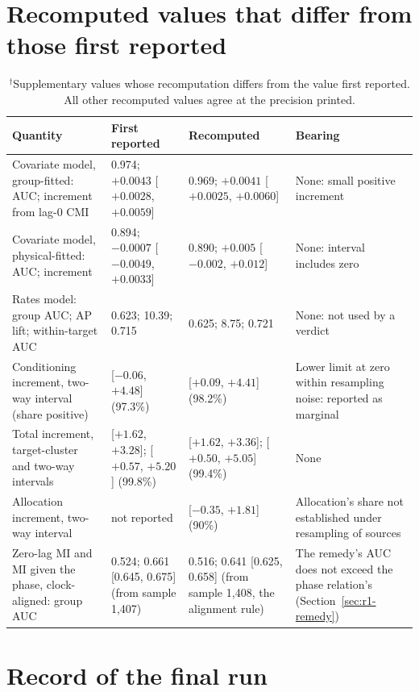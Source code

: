 \section{Recomputed values that differ from those first reported}

\begin{table}[tbp]
  \centering
  \footnotesize
  \caption[Recomputed values that differ from those first reported]{$^{\dagger}$Supplementary values whose recomputation differs from the value first reported. All other recomputed values agree at the precision printed.}
  \label{tab:app-recompute}
  \begin{tabular}{@{}L{5.2cm}L{3.2cm}L{3.2cm}L{3.0cm}@{}}
    \toprule
    Quantity & First reported & Recomputed & Bearing \\
    \midrule
    Covariate model, group-fitted: AUC; increment from lag-0 CMI & 0.974; $+0.0043$ [$+0.0028$, $+0.0059$] & 0.969; $+0.0041$ [$+0.0025$, $+0.0060$] & None: small positive increment \\
    Covariate model, physical-fitted: AUC; increment & 0.894; $-0.0007$ [$-0.0049$, $+0.0033$] & 0.890; $+0.005$ [$-0.002$, $+0.012$] & None: interval includes zero \\
    Rates model: group AUC; AP lift; within-target AUC & 0.623; 10.39; 0.715 & 0.625; 8.75; 0.721 & None: not used by a verdict \\
    Conditioning increment, two-way interval (share positive) & [$-0.06$, $+4.48$] (97.3\%) & [$+0.09$, $+4.41$] (98.2\%) & Lower limit at zero within resampling noise: reported as marginal \\
    Total increment, target-cluster and two-way intervals & [$+1.62$, $+3.28$]; [$+0.57$, $+5.20$] (99.8\%) & [$+1.62$, $+3.36$]; [$+0.50$, $+5.05$] (99.4\%) & None \\
    Allocation increment, two-way interval & not reported & [$-0.35$, $+1.81$] (90\%) & Allocation's share not established under resampling of sources \\
    Zero-lag MI and MI given the phase, clock-aligned: group AUC & 0.524; 0.661 [0.645, 0.675] (from sample 1,407) & 0.516; 0.641 [0.625, 0.658] (from sample 1,408, the alignment rule) & The remedy's AUC does not exceed the phase relation's (Section~\ref{sec:r1-remedy}) \\
    \bottomrule
  \end{tabular}
\end{table}

\section{Record of the final run}

